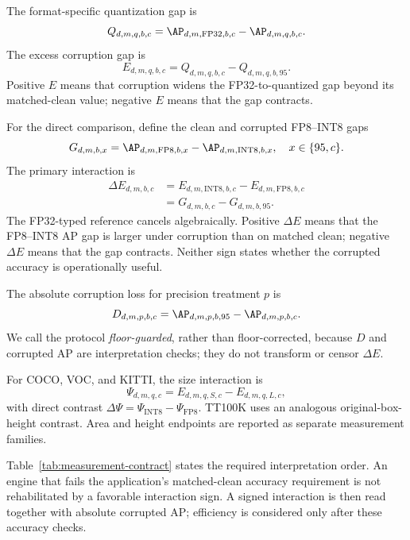 The format-specific quantization gap is
\begin{equation}
Q_{d,m,q,b,c}=\AP_{d,m,\mathrm{FP32},b,c}-\AP_{d,m,q,b,c}.
\label{eq:q}
\end{equation}
The excess corruption gap is
\begin{equation}
E_{d,m,q,b,c}=Q_{d,m,q,b,c}-Q_{d,m,q,b,95}.
\label{eq:e}
\end{equation}
Positive $E$ means that corruption widens the FP32-to-quantized gap beyond its
matched-clean value; negative $E$ means that the gap contracts.

For the direct comparison, define the clean and corrupted FP8--INT8 gaps
\begin{equation}
G_{d,m,b,x}=\AP_{d,m,\mathrm{FP8},b,x}-
             \AP_{d,m,\mathrm{INT8},b,x},\quad x\in\{95,c\}.
\end{equation}
The primary interaction is
\begin{align}
\Delta E_{d,m,b,c}
&=E_{d,m,\mathrm{INT8},b,c}-E_{d,m,\mathrm{FP8},b,c}\nonumber\\
&=G_{d,m,b,c}-G_{d,m,b,95}.
\label{eq:delta-e}
\end{align}
The FP32-typed reference cancels algebraically. Positive $\Delta E$ means that
the FP8--INT8 AP gap is larger under corruption than on matched clean; negative
$\Delta E$ means that the gap contracts. Neither sign states whether the
corrupted accuracy is operationally useful.

The absolute corruption loss for precision treatment $p$ is
\begin{equation}
D_{d,m,p,b,c}=\AP_{d,m,p,b,95}-\AP_{d,m,p,b,c}.
\label{eq:d}
\end{equation}
We call the protocol \emph{floor-guarded}, rather than floor-corrected, because
$D$ and corrupted AP are interpretation checks; they do not transform or censor
$\Delta E$.

For COCO, VOC, and KITTI, the size interaction is
\begin{equation}
\Psi_{d,m,q,c}=E_{d,m,q,S,c}-E_{d,m,q,L,c},
\end{equation}
with direct contrast $\Delta\Psi=\Psi_{\mathrm{INT8}}-
\Psi_{\mathrm{FP8}}$. TT100K uses an analogous original-box-height contrast.
Area and height endpoints are reported as separate measurement families.

Table~\ref{tab:measurement-contract} states the required interpretation order.
An engine that fails the application's matched-clean accuracy requirement is
not rehabilitated by a favorable interaction sign. A signed interaction is then
read together with absolute corrupted AP; efficiency is considered only after
these accuracy checks.

